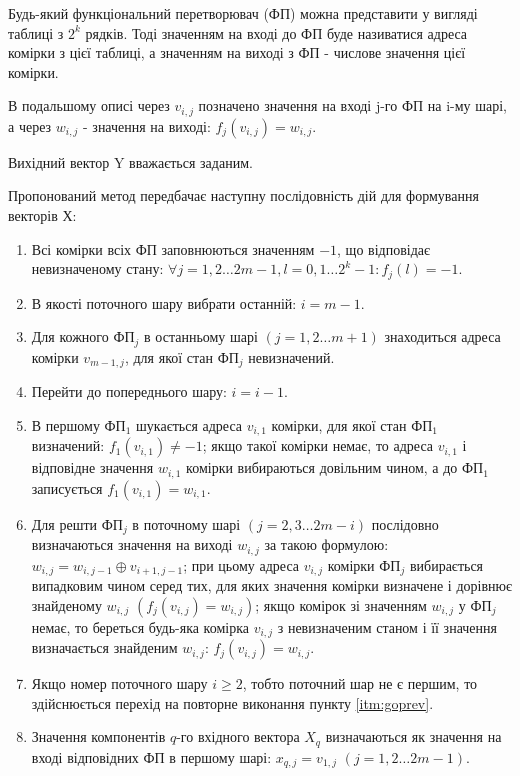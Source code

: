 \documentclass[12pt]{article}
\begin{document}
Будь-який функціональний перетворювач (ФП) можна представити у вигляді таблиці з $2^k$ рядків. Тоді значенням на вході до ФП буде називатися адреса комірки з цієї таблиці, а значенням на виході з ФП - числове значення цієї комірки.

В подальшому описі через $v_{i,j}$ позначено значення на вході j-го ФП на i-му шарі, а через $w_{i,j}$ - значення на виході: $f_j(v_{i,j}) = w_{i,j}$.

Вихідний вектор Y вважається заданим.

Пропонований метод передбачає наступну послідовність дій для формування векторів Х:

\begin{enumerate}
\item Всі комірки всіх ФП заповнюються значенням $-1$, що відповідає невизначеному стану: $\forall j=1,2 \ldots 2m-1, l=0,1 \ldots 2^k-1 : f_j(l) = -1$.
\item \label{itm:start} В якості поточного шару вибрати останній: $i=m-1$.
\item \label{itm:findundef}Для кожного ФП$_j$ в останньому шарі $(j=1,2 \ldots m+1)$ знаходиться адреса комірки $v_{m-1,j}$, для якої стан ФП$_j$ невизначений.
\item \label{itm:goprev} Перейти до попереднього шару: $i=i-1$.
\item В першому ФП$_1$ шукається адреса $v_{i,1}$ комірки, для якої стан ФП$_1$ визначений: $f_1(v_{i,1}) \neq -1$;
якщо такої комірки немає, то адреса $v_{i,1}$ і відповідне значення $w_{i,1}$ комірки вибираються довільним чином, а до ФП$_1$ записується $f_1(v_{i,1})=w_{i,1}$.
\item Для решти ФП$_j$ в поточному шарі $(j=2,3 \ldots 2m-i)$ послідовно визначаються значення на виході $w_{i,j}$ за такою формулою: $w_{i,j} = w_{i,j-1} \oplus v_{i+1,j-1}$;
при цьому адреса $v_{i,j}$ комірки ФП$_j$ вибирається випадковим чином серед тих, для яких значення комірки визначене і дорівнює знайденому $w_{i,j}$ $(f_j(v_{i,j})=w_{i,j})$;
якщо комірок зі значенням $w_{i,j}$ у ФП$_j$ немає, то береться будь-яка комірка $v_{i,j}$ з невизначеним станом і її значення визначається знайденим $w_{i,j}$: $f_j(v_{i,j})=w_{i,j}$.
\item Якщо номер поточного шару $i \geq 2$, тобто поточний шар не є першим, то здійснюється перехід на повторне виконання пункту \ref{itm:goprev}.
\item Значення компонентів $q$-го вхідного вектора $X_q$ визначаються як значення на вході відповідних ФП в першому шарі: $x_{q,j}=v_{1,j}$ $(j=1,2 \ldots 2m-1)$.

\end{enumerate}
\end{document}
